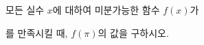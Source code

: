 모든 실수 $x$에 대하여 미분가능한 함수 $f(x)$가 \par\smallskip{}\par\smallskip\noindent 를 만족시킬 때, $f(\pi)$의 값을 구하시오.

